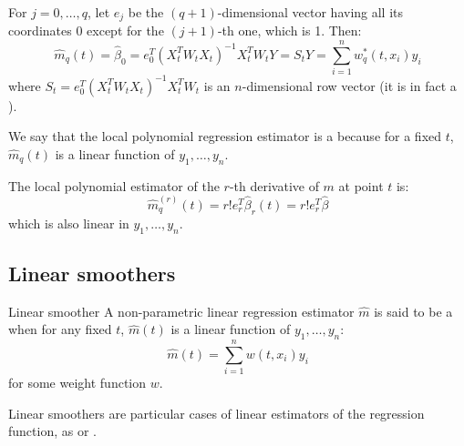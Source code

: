 For $j=0,\ldots,q$, let $e_j$ be the $(q+1)$-dimensional vector
having all its coordinates 0 except for the $(j+1)$-th one, which is 1.
Then:
\begin{equation*}
	\hat m_q(t) = \hat \beta_0 = e_0^T (X_t^T W_t X_t)^{-1} X_t^T W_t Y = S_tY = \sum_{i=1}^n w^*_q(t, x_i) y_i
\end{equation*}
where $S_t = e_0^T (X_t^T W_t X_t)^{-1} X_t^T W_t$ is an $n$-dimensional row vector (it
is in fact a ).

\begin{note}
	We say that the local polynomial regression estimator is a 
	because for a fixed $t$, $\hat m_q(t)$ is a linear function of $y_1,\ldots,y_n$.
\end{note}

The local polynomial estimator of the $r$-th derivative of $m$ at point $t$ is:
\begin{equation*}
	\hat m_q^{(r)}(t) = r!e_r^T\hat\beta_r(t) = r!e_r^T\hat\beta
\end{equation*}
which is also linear in $y_1,\ldots,y_n$.

\subsection{Linear smoothers}

\begin{definition}{Linear smoother}{}
	A non-parametric linear regression estimator $\hat m$ is said to be
	a  when for any fixed $t$, $\hat m(t)$ is a linear function of
	$y_1,\ldots,y_n$:
	\begin{equation*}
		\hat m(t) = \sum_{i=1}^n w(t, x_i) y_i
	\end{equation*}
	for some weight function $w$.
	\tcblower
	\begin{note}
		Linear smoothers are particular cases of linear estimators of the regression
		function, as  or .
	\end{note}
\end{definition}

